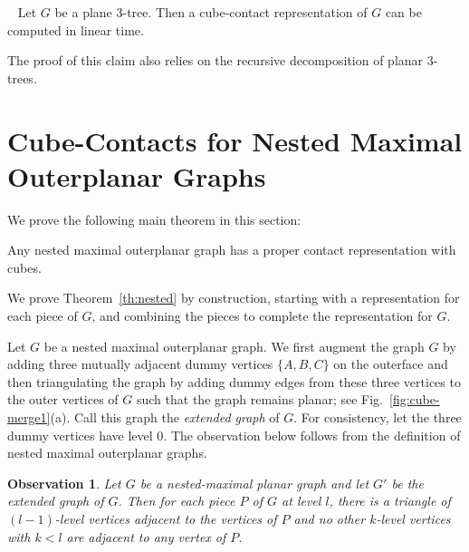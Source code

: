 \documentclass{llncs}
\newtheorem{obs}[lemma]{Observation}
\begin{document}
\begin{theorem}~\cite{BEF+12}
Let $G$ be a plane 3-tree. Then a cube-contact representation of $G$ can be computed in linear
 time.
\end{theorem}

The proof of this claim also relies on the recursive decomposition of
planar 3-trees. 











\section{Cube-Contacts for Nested Maximal Outerplanar Graphs}


We prove the following main theorem in this section:



\begin{theorem}
Any nested maximal outerplanar graph has a proper contact representation with cubes.
\label{th:nested}
\end{theorem}



We prove Theorem~\ref{th:nested} by construction, starting with a representation
 for each piece of $G$, and combining the pieces to complete the
 representation for $G$.



Let $G$ be a nested maximal outerplanar graph. We first augment the graph $G$ by adding
 three mutually adjacent dummy vertices $\{A, B, C\}$ on the outerface
 and then triangulating the graph by adding dummy edges from these three
 vertices to the outer vertices of $G$ such that the graph remains planar; see
 Fig.~\ref{fig:cube-merge1}(a). Call this graph the \textit{extended graph} of $G$.
 For consistency, let the three dummy vertices have level $0$.
 The observation below follows from the definition of nested maximal outerplanar graphs.


\begin{obs}
	\label{obs:extended} Let $G$ be a nested-maximal planar graph and let $G'$ be the
	extended graph of $G$. Then for each piece $P$ of $G$ at level $l$, there is a triangle
	of $(l-1)$-level vertices adjacent to the vertices of $P$ and no other $k$-level
	vertices with $k<l$ are adjacent to any vertex of $P$.
\end{obs}
\end{document}
